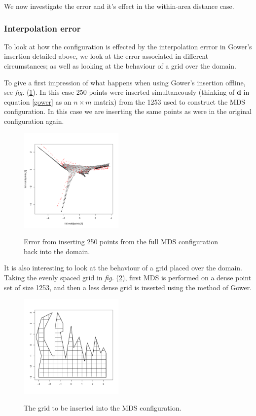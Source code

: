 \documentclass[a4paper,10pt]{amsart}
\newcommand{\fig}[1]{\emph{fig.} (\ref{#1})}
\newcommand{\cross}{\times}
\begin{document}
We now investigate the error and it's effect in the within-area distance case.


\subsubsection{Interpolation error}

To look at how the configuration is effected by the interpolation errror in Gower's insertion detailed above, we look at the error associated in different circumstances; as well as looking at the behaviour of a grid over the domain.

To give a first impression of what happens when using Gower's insertion offline, see \fig{gowerfullinsert}. In this case 250 points were inserted simultaneously (thinking of $\mathbf{d}$ in equation \ref{gower} as an $n \cross m$ matrix) from the 1253 used to construct the MDS configuration. In this case we are inserting the same points as were in the original configuration again.



\begin{figure}
\centering
\includegraphics[width=2in]{figs/wt2-gowererr-fullover.pdf} \\
\caption{Error from inserting 250 points from the full MDS configuration back into the domain.}
\label{gowerfullinsert}
\end{figure}


It is also interesting to look at the behaviour of a grid placed over the domain. Taking the evenly spaced grid in \fig{wt2-grid-orig}, first MDS is performed on a dense point set of size 1253, and then a less dense grid is inserted using the method of Gower.


\begin{figure}
\centering
\includegraphics[width=2in]{figs/wt2-grid-orig.pdf} \\
\caption{The grid to be inserted into the MDS configuration.}
\label{wt2-grid-orig}
\end{figure}
\end{document}
